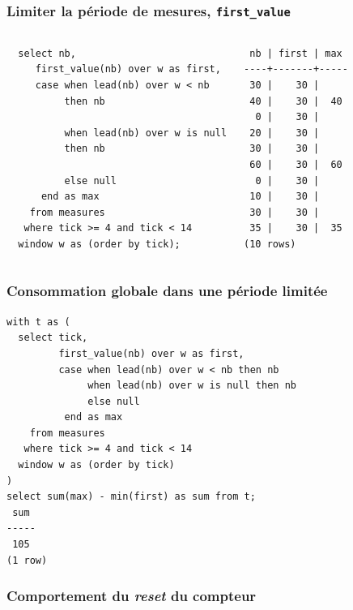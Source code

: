 \documentclass{beamer}
\begin{document}
\begin{frame}[fragile]
  \frametitle{Limiter la période de mesures, \texttt{first\_value}}

\begin{columns}
\begin{verbatim}
  select nb,
     first_value(nb) over w as first,
     case when lead(nb) over w < nb
          then nb

          when lead(nb) over w is null
          then nb

          else null
      end as max
    from measures
   where tick >= 4 and tick < 14
  window w as (order by tick);
\end{verbatim}

\begin{verbatim}
 nb | first | max 
----+-------+-----
 30 |    30 |    
 40 |    30 |  40
  0 |    30 |    
 20 |    30 |    
 30 |    30 |    
 60 |    30 |  60
  0 |    30 |    
 10 |    30 |    
 30 |    30 |    
 35 |    30 |  35
(10 rows)
\end{verbatim}
\end{columns}
\end{frame}

\begin{frame}[fragile]
  \frametitle{Consommation globale dans une période limitée}

\begin{verbatim}
with t as (
  select tick,
         first_value(nb) over w as first,
         case when lead(nb) over w < nb then nb
              when lead(nb) over w is null then nb
              else null
          end as max
    from measures
   where tick >= 4 and tick < 14
  window w as (order by tick)
)
select sum(max) - min(first) as sum from t;
 sum 
-----
 105
(1 row)
\end{verbatim}
\end{frame}

\begin{frame}[fragile]
  \frametitle{Comportement du \textit{reset} du compteur}

  
\end{frame}
\end{document}
